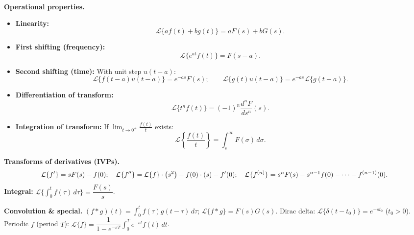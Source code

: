 \textbf{Operational properties.}
\begin{itemize}[noitemsep,topsep=2pt]
  \item \textbf{Linearity:}
  $$\mathcal{L}\{a f(t) + b g(t)\} = a F(s) + b G(s).$$
  \item \textbf{First shifting (frequency):}
  $$\mathcal{L}\{e^{at} f(t)\} = F(s-a).$$
  \item \textbf{Second shifting (time):} With unit step $u(t-a)$:
  $$\mathcal{L}\{f(t-a)u(t-a)\} = e^{-as} F(s); \qquad \mathcal{L}\{g(t)u(t-a)\} = e^{-as} \mathcal{L}\{g(t+a)\}.$$
  \item \textbf{Differentiation of transform:}
  $$\mathcal{L}\{t^n f(t)\} = (-1)^n \frac{d^n F}{ds^n}(s).$$
  \item \textbf{Integration of transform:} If $\displaystyle\lim_{t \to 0^+} \frac{f(t)}{t}$ exists:
  $$\mathcal{L}\left\{\frac{f(t)}{t}\right\} = \int_{s}^{\infty} F(\sigma) \, d\sigma.$$
\end{itemize}

\textbf{Transforms of derivatives (IVPs).}
$$
\mathcal{L}\{f'\} = s F(s) - f(0); \quad \mathcal{L}\{f''\} = \mathcal{L}\{f\} \cdot \left(s^2\right) - f(0) \cdot \left(s\right) - f'(0); \quad \mathcal{L}\{f^{(n)}\} = s^n F(s) - s^{n-1} f(0) - \cdots - f^{(n-1)}(0).
$$
\textbf{Integral:} $\mathcal{L}\bigl\{\displaystyle\int_0^t f(\tau)\,d\tau\bigr\} = \dfrac{F(s)}{s}$.

\textbf{Convolution \& special.} $(f * g)(t) = \displaystyle\int_0^t f(\tau)g(t-\tau)\,d\tau$; $\mathcal{L}\{f * g\} = F(s)G(s)$. Dirac delta: $\mathcal{L}\{\delta(t - t_0)\} = e^{-s t_0}$ ($t_0 > 0$). Periodic $f$ (period $T$): $\mathcal{L}\{f\} = \dfrac{1}{1 - e^{-sT}} \displaystyle\int_0^T e^{-st} f(t)\,dt$.

